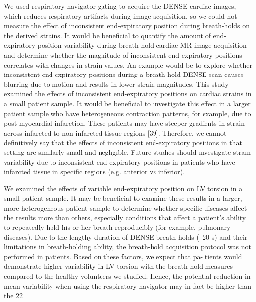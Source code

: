 	We used respiratory navigator gating to acquire the DENSE cardiac images, which reduces respiratory artifacts during image acquisition, so we could not measure the effect of inconsistent end-expiratory position during breath-holds on the derived strains. It would be beneficial to quantify the amount of end-expiratory position variability during breath-hold cardiac MR image acquisition and determine whether the magnitude of inconsistent end-expiratory positions correlates with changes in strain values. An example would be to explore whether inconsistent end-expiratory positions during a breath-hold DENSE scan causes blurring due to motion and results in lower strain magnitudes.
	This study examined the effects of inconsistent end-expiratory positions on cardiac strains in a small patient sample. It would be beneficial to investigate this effect in a larger patient sample who have heterogeneous contraction patterns, for example, due to post-myocardial infarction. These patients may have steeper gradients in strain across infarcted to non-infarcted tissue regions [39]. Therefore, we cannot definitively say that the effects of inconsistent end-expiratory positions in that setting are similarly small and negligible. Future studies should investigate strain variability due to inconsistent end-expiratory positions in patients who have infarcted tissue in specific regions (e.g. anterior vs inferior).
	
	We examined the effects of variable end-expiratory position on LV torsion in a small patient sample. It may be beneficial to examine these results in a larger, more heterogeneous patient sample to determine whether specific diseases affect the results more than others, especially conditions that affect a patient’s ability to repeatedly hold his or her breath reproducibly (for example, pulmonary diseases). Due to the lengthy duration of DENSE breath-holds
	(~20 s) and their limitations in breath-holding ability, the breath-hold acquisition protocol was not performed in patients. Based on these factors, we expect that pa- tients would demonstrate higher variability in LV torsion with the breath-hold measures compared to the healthy volunteers we studied. Hence, the potential reduction in mean variability when using the respiratory navigator may in fact be higher than the 22%
	

